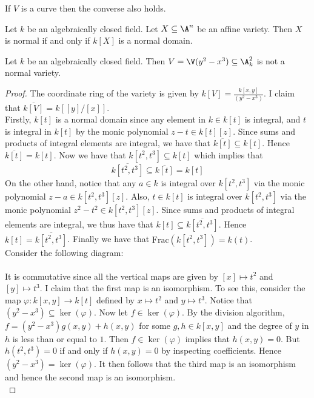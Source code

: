 \documentclass[a4paper]{article}
\begin{document}
If $V$ is a curve then the converse also holds. 

\begin{prp}{}{} Let $k$ be an algebraically closed field. Let $X\subseteq\A^n$ be an affine variety. Then $X$ is normal if and only if $k[X]$ is a normal domain. 
\end{prp}

\begin{eg}{}{} Let $k$ be an algebraically closed field. Then $V=\V(y^2-x^3)\subseteq\A_k^2$ is not a normal variety. 
\begin{proof}
The coordinate ring of the variety is given by $k[V]=\frac{k[x,y]}{(y^2-x^3)}$. I claim that $\overline{k[V]}=k[[y]/[x]]$. \\

Firstly, $k[t]$ is a normal domain since any element in $k\in k[t]$ is integral, and $t$ is integral in $k[t]$ by the monic polynomial $z-t\in k[t][z]$. Since sums and products of integral elements are integral, we have that $\overline{k[t]}\subseteq k[t]$. Hence $\overline{k[t]}=k[t]$. Now we have that $k[t^2,t^3]\subseteq k[t]$ which implies that $$\overline{k[t^2,t^3]}\subseteq\overline{k[t]}=k[t]$$ On the other hand, notice that any $a\in k$ is integral over $k[t^2,t^3]$ via the monic polynomial $z-a\in k[t^2,t^3][z]$. Also, $t\in k[t]$ is integral over $k[t^2,t^3]$ via the monic polynomial $z^2-t^2\in k[t^2,t^3][z]$. Since sums and products of integral elements are integral, we thus have that $k[t]\subseteq\overline{k[t^2,t^3]}$. Hence $k[t]=\overline{k[t^2,t^3]}$. Finally we have that $\text{Frac}(k[t^2,t^3])=k(t)$. \\

Consider the following diagram: \\
 \\
It is commutative since all the vertical maps are given by $[x]\mapsto t^2$ and $[y]\mapsto t^3$. I claim that the first map is an isomorphism. To see this, consider the map $\varphi:k[x,y]\to k[t]$ defined by $x\mapsto t^2$ and $y\mapsto t^3$. Notice that $(y^2-x^3)\subseteq\ker(\varphi)$. Now let $f\in\ker(\varphi)$. By the division algorithm, $f=(y^2-x^3)g(x,y)+h(x,y)$ for some $g,h\in k[x,y]$ and the degree of $y$ in $h$ is less than or equal to $1$. Then $f\in\ker(\varphi)$ implies that $h(x,y)=0$. But $h(t^2,t^3)=0$ if and only if $h(x,y)=0$ by inspecting coefficients. Hence $(y^2-x^3)=\ker(\varphi)$. It then follows that the third map is an isomorphism and hence the second map is an isomorphism. \\


\end{proof}
\end{eg}
\end{document}
